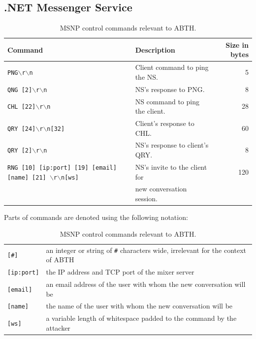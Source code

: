 \documentclass{sig-alternate}
\begin{document}
\subsection{.NET Messenger Service}

\begin{table}[tbp]
	\centering

	\caption {MSNP control commands relevant to ABTH.}
	\label{tab:commandlist}

	\begin{tabular}{llr}
		\hline
		\textbf{Command} & \textbf{Description} & \textbf{Size in bytes} \\
		\hline
		\hline
		\texttt{PNG$\backslash$r$\backslash$n} & Client command to ping the NS. & 5 \\
		\texttt{QNG [2]$\backslash$r$\backslash$n} & NS's response to PNG. & 8 \\
		\texttt{CHL [22]$\backslash$r$\backslash$n} & NS command to ping the client. & 28 \\
		\texttt{QRY [24]$\backslash$r$\backslash$n[32]} & Client's response to CHL. & 60 \\
		\texttt{QRY [2]$\backslash$r$\backslash$n} & NS's response to client's QRY. & 8 \\
		\texttt{RNG [10] [ip:port] [19] [email] [name] [21] $\backslash$r$\backslash$n[ws]} & NS's invite to the client for  & 120 \\
		& new conversation session. & \\
		\hline
	\end{tabular}

	\begin{flushleft}
	Parts of commands are denoted using the following notation:

	\begin{tabular}{ll}
		\texttt{[\#]}        & an integer or string of \texttt{\#} characters wide, irrelevant for the context of ABTH\\
		\texttt{[ip:port]} & the IP address and TCP port of the mixer server\\
		\texttt{[email]}  & an email address of the user with whom the new conversation will be\\
		\texttt{[name]} & the name of the user with whom the new conversation will be\\
		\texttt{[ws]}      & a variable length of whitespace padded to the command by the attacker\\
	\end{tabular}
	\end{flushleft}
\end{table}
\end{document}
